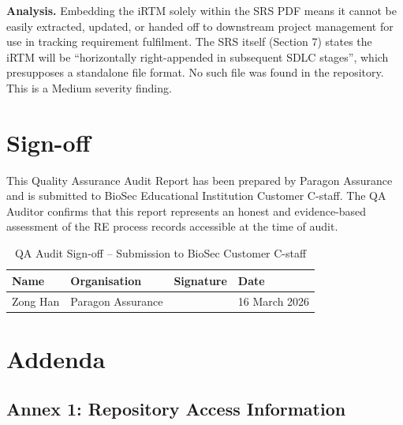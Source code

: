 \documentclass[11pt,a4paper]{article}
\begin{document}
\textbf{Analysis.}
Embedding the iRTM solely within the SRS PDF means it cannot be easily extracted, updated, or handed off to downstream project management for use in tracking requirement fulfilment. The SRS itself (Section 7) states the iRTM will be ``horizontally right-appended in subsequent SDLC stages'', which presupposes a standalone file format. No such file was found in the repository. This is a Medium severity finding.


\section{Sign-off}

This Quality Assurance Audit Report has been prepared by Paragon Assurance and is submitted to BioSec Educational Institution Customer C-staff. The QA Auditor confirms that this report represents an honest and evidence-based assessment of the RE process records accessible at the time of audit.

\begin{table}[H]
\centering
\small
\renewcommand{\arraystretch}{2.0}
\begin{tabular}{|m{}|m{}|m{}|m{}|}
\hline
\rowcolor{tableheader}
\textbf{Name} & \textbf{Organisation} & \textbf{Signature} & \textbf{Date} \\
\hline
Zong Han & Paragon Assurance & & 16 March 2026 \\
\hline
\end{tabular}
\caption{QA Audit Sign-off -- Submission to BioSec Customer C-staff}
\label{tab:qa-signoff}
\end{table}


\section{Addenda}

\subsection*{Annex 1: Repository Access Information}

\begin{center}
\end{center}
\end{document}
